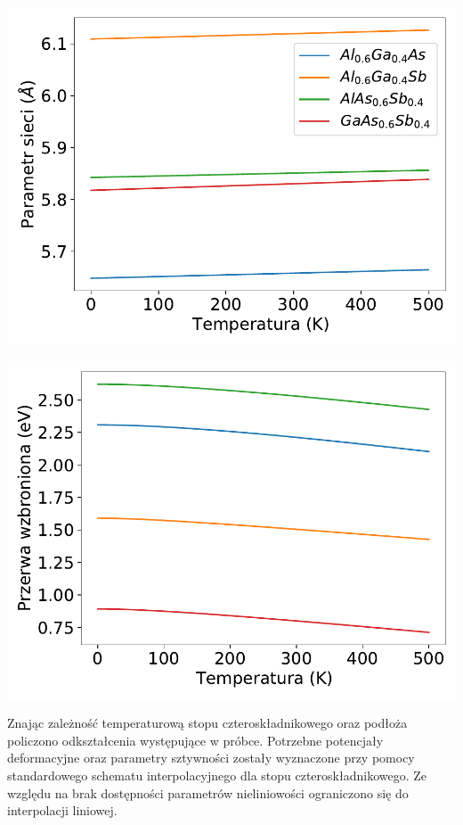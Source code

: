 \documentclass[12pt,openany,a4paper]{book}
\begin{document}
\begin{minipage}[t]{0.5\textwidth}
	\includegraphics[width = \linewidth]{Figures/strain/ter_alc2.pdf}\label{fig:ter_alc1}
\end{minipage}
\begin{minipage}[t]{0.5\textwidth}
	\includegraphics[width = \linewidth]{Figures/strain/ter_eg2.pdf}\label{fig:ter_eg2}
\end{minipage}
\begin{center}
\end{center}

Znając zależność temperaturową stopu czteroskładnikowego oraz podłoża policzono
odkształcenia występujące w próbce. Potrzebne potencjały deformacyjne oraz parametry sztywności
zostały wyznaczone przy pomocy standardowego schematu interpolacyjnego dla stopu czteroskładnikowego.
Ze względu na brak dostępności parametrów nieliniowości ograniczono się do interpolacji liniowej.
\end{document}
